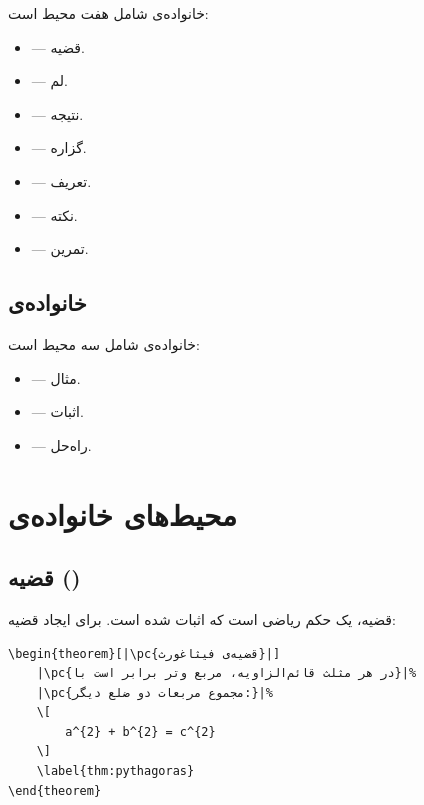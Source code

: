 خانواده‌ی  شامل هفت محیط است:

\begin{itemize}
    \item {} — قضیه.
    \item {} — لم.
    \item {} — نتیجه.
    \item {} — گزاره.
    \item {} — تعریف.
    \item {} — نکته.
    \item {} — تمرین.
\end{itemize}

\subsection{خانواده‌ی }
\label{sec:environments-outline}

خانواده‌ی  شامل سه محیط است:

\begin{itemize}
    \item {} — مثال.
    \item {} — اثبات.
    \item {} — راه‌حل.
\end{itemize}


\section{محیط‌های خانواده‌ی }
\label{sec:environments-matinbox-detail}

\subsection{قضیه ()}
\label{sec:environments-theorem}

قضیه، یک حکم ریاضی است که اثبات شده است.
برای ایجاد قضیه:

\begin{latin}
\begin{verbatim}
\begin{theorem}[|\pc{قضیه‌ی فیثاغورث}|]
    |\pc{در هر مثلث قائم‌الزاویه، مربع وتر برابر است با}|%
    |\pc{مجموع مربعات دو ضلع دیگر:}|%
    \[
        a^{2} + b^{2} = c^{2}
    \]
    \label{thm:pythagoras}
\end{theorem}
\end{verbatim}
\end{latin}

